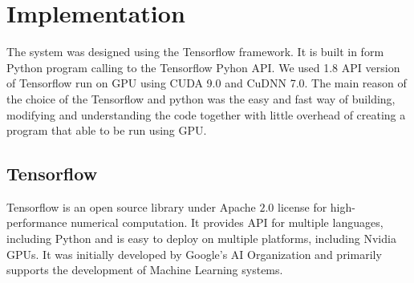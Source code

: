 
\section{Implementation}


The system was designed using the Tensorflow framework. 
It is built in form Python program calling to the Tensorflow Pyhon API.
We used 1.8 API version of Tensorflow run on GPU using CUDA 9.0 and CuDNN 7.0.
The main reason of the choice of the Tensorflow and python was the easy and fast way of building, modifying and understanding the code together with little overhead of
creating a program that able to be run using GPU. 
\medskip

\subsection{Tensorflow}

Tensorflow is an open source library under Apache $2.0$ license for high-performance numerical computation\cite{tensorflow_main}.
It provides API for multiple languages, including Python and is easy to deploy on multiple platforms, including Nvidia GPUs.
It was initially developed by Google's AI Organization and primarily supports the development of Machine Learning systems.
\medskip

